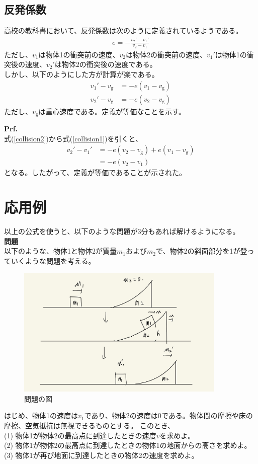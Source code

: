 \documentclass[a4paper,11pt]{jsarticle}
\numberwithin{equation}{section}
\begin{document}
\subsection{反発係数}
高校の教科書において、反発係数は次のように定義されているようである。
\begin{align}
    e = -\frac{v_2' - v_1'}{v_2 - v_1}
\end{align}
ただし、$v_1$は物体1の衝突前の速度、$v_2$は物体2の衝突前の速度、$v_1'$は物体1の衝突後の速度、$v_2'$は物体2の衝突後の速度である。\\
しかし、以下のようにした方が計算が楽である。
\begin{align}
    v_1' - v_{\text{g}} &= -e(v_1 - v_{\text{g}}) \label{collision1} \\
    v_2' - v_{\text{g}} &= -e(v_2 - v_{\text{g}}) \label{collision2}
\end{align}
ただし、$v_{\text{g}}$は重心速度である。定義が等価なことを示す。

\textbf{Prf.}\\
式(\ref{collision2})から式(\ref{collision1})を引くと、
\begin{align}
    v_2' - v_1' &= -e(v_2 - v_{\text{g}}) + e(v_1 - v_{\text{g}})\\
    &= -e(v_2 - v_1)
\end{align}
となる。したがって、定義が等価であることが示された。\\

\section{応用例}
以上の公式を使うと、以下のような問題が3分もあれば解けるようになる。\\
\textbf{問題}\\
以下のような、物体1と物体2が質量$m_1$および$m_2$で、物体2の斜面部分を1が登っていくような問題を考える。
\begin{figure}[H]
    \begin{center}
    \includegraphics[width=100mm]{q.jpg}
    \end{center}
    \caption{問題の図}
    \label{fig:one}
\end{figure}
はじめ、物体1の速度は$v_1$であり、物体2の速度は0である。物体間の摩擦や床の摩擦、空気抵抗は無視できるものとする。
このとき、\\
(1) 物体1が物体2の最高点に到達したときの速度$v$を求めよ。\\
(2) 物体1が物体2の最高点に到達したときの物体1の地面からの高さを求めよ。\\
(3) 物体1が再び地面に到達したときの物体2の速度を求めよ。\\
\end{document}
